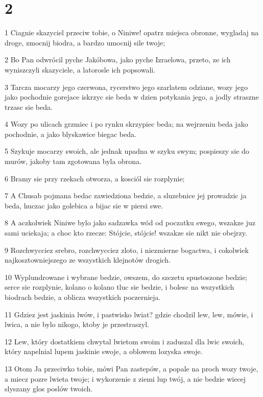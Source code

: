 \chapter{2}

\par 1 Ciagnie skazyciel przeciw tobie, o Niniwe! opatrz miejsca obronne, wygladaj na droge, zmocnij biodra, a bardzo umocnij sile twoje;
\par 2 Bo Pan odwrócil pyche Jakóbowa, jako pyche Izraelowa, przeto, ze ich wyniszczyli skazyciele, a latorosle ich popsowali.
\par 3 Tarcza mocarzy jego czerwona, rycerstwo jego szarlatem odziane, wozy jego jako pochodnie gorejace iskrzyc sie beda w dzien potykania jego, a jodly straszne trzasc sie beda.
\par 4 Wozy po ulicach grzmiec i po rynku skrzypiec beda; na wejrzeniu beda jako pochodnie, a jako blyskawice biegac beda.
\par 5 Szykuje mocarzy swoich, ale jednak upadna w szyku swym; pospieszy sie do murów, jakoby tam zgotowana byla obrona.
\par 6 Bramy sie przy rzekach otworza, a kosciól sie rozplynie;
\par 7 A Chusab pojmana bedac zawiedziona bedzie, a sluzebnice jej prowadzic ja beda, huczac jako golebica a bijac sie w piersi swe.
\par 8 A aczkolwiek Niniwe bylo jako sadzawka wód od poczatku swego, wszakze juz sami uciekaja; a choc kto rzecze: Stójcie, stójcie! wszakze sie nikt nie obejrzy.
\par 9 Rozchwycciez srebro, rozchwycciez zloto, i niezmierne bogactwa, i cokolwiek najkosztowniejszego ze wszystkich klejnotów drogich.
\par 10 Wyplundrowane i wybrane bedzie, owszem, do szczetu spustoszone bedzie; serce sie rozplynie, kolano o kolano tluc sie bedzie, i bolesc na wszystkich biodrach bedzie, a oblicza wszystkich poczernieja.
\par 11 Gdziez jest jaskinia lwów, i pastwisko lwiat? gdzie chodzil lew, lew, mówie, i lwica, a nie bylo nikogo, ktoby je przestraszyl.
\par 12 Lew, który dostatkiem chwytal lwietom swoim i zaduszal dla lwic swoich, który napelnial lupem jaskinie swoje, a oblowem lozyska swoje.
\par 13 Otom Ja przeciwko tobie, mówi Pan zastepów, a popale na proch wozy twoje, a miecz pozre lwieta twoje; i wykorzenie z ziemi lup twój, a nie bedzie wiecej slyszany glos poslów twoich.

